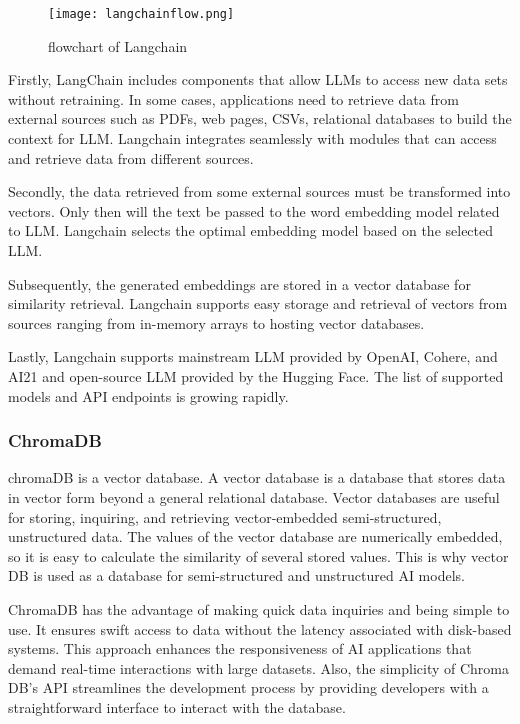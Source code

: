 \documentclass[runningheads]{llncs}
\begin{document}
\begin{spacing}{1.25}
\begin{figure}
\texttt{[image: langchainflow.png]}
\caption{flowchart of Langchain} \label{fig1}
\end{figure}

Firstly, LangChain includes components that allow LLMs to access new data sets without retraining. In some cases, applications need to retrieve data from external sources such as PDFs, web pages, CSVs, relational databases to build the context for LLM. Langchain integrates seamlessly with modules that can access and retrieve data from different sources.

Secondly, the data retrieved from some external sources must be transformed into vectors. Only then will the text be passed to the word embedding model related to LLM. Langchain selects the optimal embedding model based on the selected LLM.

Subsequently, the generated embeddings are stored in a vector database for similarity retrieval. Langchain supports easy storage and retrieval of vectors from sources ranging from in-memory arrays to hosting vector databases.

Lastly, Langchain supports mainstream LLM provided by OpenAI, Cohere, and AI21 and open-source LLM provided by the Hugging Face. The list of supported models and API endpoints is growing rapidly.

\subsubsection{ChromaDB} chromaDB is a vector database. A vector database is a database that stores data in vector form beyond a general relational database. Vector databases are useful for storing, inquiring, and retrieving vector-embedded semi-structured, unstructured data. The values of the vector database are numerically embedded, so it is easy to calculate the similarity of several stored values. This is why vector DB is used as a database for semi-structured and unstructured AI models.

ChromaDB has the advantage of making quick data inquiries and being simple to use. It ensures swift access to data without the latency associated with disk-based systems. This approach enhances the responsiveness of AI applications that demand real-time interactions with large datasets. Also, the simplicity of Chroma DB's API streamlines the development process by providing developers with a straightforward interface to interact with the database.


\end{spacing}
\end{document}
